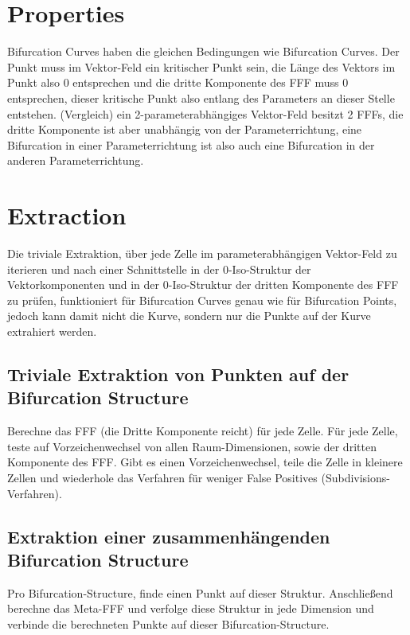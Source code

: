 \documentclass[11pt]{article}
\begin{document}
\section{Properties}
Bifurcation Curves haben die gleichen Bedingungen wie Bifurcation Curves. Der Punkt muss im Vektor-Feld ein kritischer Punkt sein, die Länge des Vektors im Punkt also 0 entsprechen und die dritte Komponente des FFF muss 0 entsprechen, dieser kritische Punkt also entlang des Parameters an dieser Stelle entstehen.
(Vergleich) ein 2-parameterabhängiges Vektor-Feld besitzt 2 FFFs, die dritte Komponente ist aber unabhängig von der Parameterrichtung, eine Bifurcation in einer Parameterrichtung ist also auch eine Bifurcation in der anderen Parameterrichtung.
\section{Extraction}
Die triviale Extraktion, über jede Zelle im parameterabhängigen Vektor-Feld zu iterieren und nach einer Schnittstelle in der 0-Iso-Struktur der Vektorkomponenten und in der 0-Iso-Struktur der dritten Komponente des FFF zu prüfen, funktioniert für Bifurcation Curves genau wie für Bifurcation Points, jedoch kann damit nicht die Kurve, sondern nur die Punkte auf der Kurve extrahiert werden.

\subsection{Triviale Extraktion von Punkten auf der Bifurcation Structure}
Berechne das FFF (die Dritte Komponente reicht) für jede Zelle.
Für jede Zelle, teste auf Vorzeichenwechsel von allen Raum-Dimensionen, sowie der dritten Komponente des FFF. Gibt es einen Vorzeichenwechsel, teile die Zelle in kleinere Zellen und wiederhole das Verfahren für weniger False Positives (Subdivisions-Verfahren).
\subsection{Extraktion einer zusammenhängenden Bifurcation Structure}
Pro Bifurcation-Structure, finde einen Punkt auf dieser Struktur. Anschließend berechne das Meta-FFF und verfolge diese Struktur in jede Dimension und verbinde die berechneten Punkte auf dieser Bifurcation-Structure.
\end{document}

